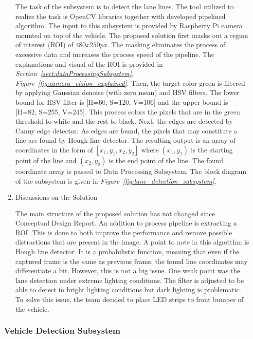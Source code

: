\documentclass[a4paper,12pt]{article}
\begin{document}
\begin{enumerate}
			The task of the subsystem is to detect the lane lines. The tool utilized to realize the task is OpenCV libraries together with developed pipelined algorithm.
			 The input to this subsystem is provided by Raspberry Pi camera mounted on top of the vehicle. The proposed solution first masks out a region of interest (ROI) of $480x250 px$. The masking eliminates the process of excessive data and increases the process speed of the pipeline. The explanations and visual of the ROI is provided in \textit{Section~\ref{sect:dataProcessingSubsystem}, Figure~\ref{fig:camera_vision_explained}}. Then, the target color green is filtered by applying Gaussian denoise (with zero mean) and HSV filters. The lower bound for HSV filter is [H=60, S=120, V=106] and the upper bound is [H=82, S=255, V=245]. This process colors the pixels that are in the green threshold to white and the rest to black. Next, the edges are detected by Canny edge detector. As edges are found, the pixels that may constitute a line are found by Hough line detector. The resulting output is an array of coordinates in the form of $[x_1, y_1, x_2, y_2]$ where $(x_1, y_1)$ is the starting point of the line and $(x_2, y_2)$ is the end point of the line. The found coordinate array is passed to Data Processing Subsystem. The block diagram of the subsystem is given in \textit{Figure~\ref{fig:lane_detection_subsystem}}.
		
			
			\item {Discussions on the Solution}
			
			The main structure of the proposed solution has not changed since Conceptual Design Report. An addition to process pipeline is extracting a ROI. This is done to both improve the performance and remove possible distractions that are present in the image. A point to note in this algorithm is Hough line detector. It is a probabilistic function, meaning that even if the captured frame is the same as previous frame, the found line coordinates may differentiate a bit. However, this is not a big issue. One weak point was the lane detection under extreme lighting conditions. The filter is adjusted to be able to detect in bright lighting conditions but dark lighting is problematic. To solve this issue, the team decided to place LED strips to front bumper of the vehicle.
			
		\end{enumerate}
	
	\subsubsection{Vehicle Detection Subsystem}
	
\end{document}
